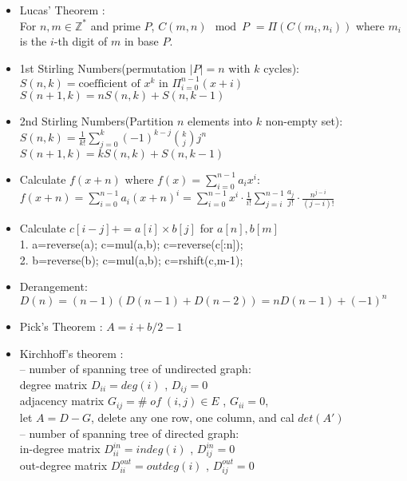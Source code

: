 \begin{itemize}
\setlength\itemsep{0.2em}
\item Lucas’ Theorem :\\
  For $n, m \in \mathbb{Z}^{*}$ and prime $P$,
  $C(m,n) \mod P$
	$= \Pi ( C(m_i,n_i) )$
	where $m_i$ is the $i$-th digit of $m$ in base $P$.
\item 1st Stirling Numbers(permutation $|P|=n$ with $k$ cycles): \\
  $S(n,k) = \text{coefficient of }x^k \text{ in } \Pi_{i=0}^{n-1} (x+i)$ \\
  $S(n+1,k) = nS(n,k)+S(n,k-1)$
\item 2nd Stirling Numbers(Partition $n$ elements into $k$ non-empty set): \\
  $S(n,k) = \frac{1}{k!} \sum\limits_{j=0}^k (-1)^{k-j} {k \choose j} j^n$ \\
  $S(n+1,k) = kS(n,k)+S(n,k-1)$
\item Calculate $f(x+n)$ where $f(x)=\sum\limits_{i=0}^{n-1}a_ix^i$: \\
  $f(x+n)=\sum\limits_{i=0}^{n-1}a_i(x+n)^i=\sum\limits_{i=0}^{n-1}x^i\cdot\frac{1}{i!}\sum\limits_{j=i}^{n-1}\frac{a_j}{j!}\cdot\frac{n^{j-i}}{(j-i)!}$
\item Calculate $c[i-j]+=a[i]\times b[j]$ for $a[n],b[m]$ \\
  1. a=reverse(a); c=mul(a,b); c=reverse(c[:n]); \\
  2. b=reverse(b); c=mul(a,b); c=rshift(c,m-1); 
\item Derangement: \\
  $D(n)=(n-1)(D(n-1)+D(n-2))=nD(n-1)+(-1)^n$
\item Pick’s Theorem : $A = i + b/2 - 1$
\item Kirchhoff's theorem :\\
  -- number of spanning tree of undirected graph:\\
  degree matrix $D_{ii} = deg(i)$ , $D_{ij} = 0$\\
  adjacency matrix $G_{ij} = \#\;of\;(i,j) \in E$ , $G_{ii} = 0$,\\
  let $A = D - G$, delete any one row, one column, and cal $det(A')$\\
  -- number of spanning tree of directed graph:\\
  in-degree matrix $D_{ii}^{in} = indeg(i)$ , $D_{ij}^{in} = 0$\\
  out-degree matrix $D_{ii}^{out} = outdeg(i)$ , $D_{ij}^{out} = 0$\\

\end{itemize}
